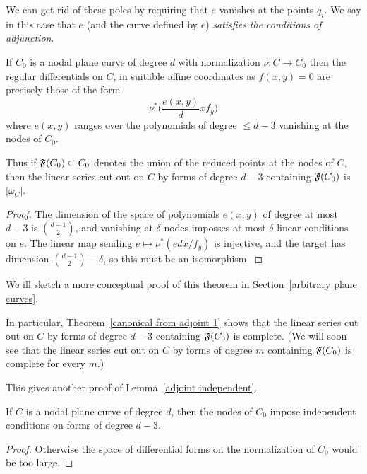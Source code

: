 We can get rid of these poles by requiring that $e$ vanishes at the points $q_i$. We say in this case that $e$ (and the curve defined by $e$) \emph{satisfies the conditions of adjunction}. 

\begin{theorem}\label{canonical from adjoint 1}
If $C_{0}$ is a nodal plane curve of degree $d$ with normalization $\nu: C\to C_{0}$
then the  regular differentials on  $C$, in suitable affine coordinates as $f(x,y) = 0$ 
 are precisely those of the form
 $$
\nu^{*}\biggl( \frac{e(x,y)}dx{f_{y}}\biggr)
$$
where 
$e(x,y)$ ranges over the polynomials of degree $\leq d-3$
vanishing at the nodes of $C_{0}.$

Thus if $\adj(C_{0})\subset C_{0}$ denotes the union
of the reduced points at the nodes of $C$, then  the linear series cut out on $C$ by 
forms of degree $d-3$ containing $\adj(C_{0})$ is $|\omega_{C}|$.
\end{theorem}

\begin{proof}
The dimension of the space of polynomials $e(x,y)$ of degree at most $d-3$ is $\binom{d-1}{2}$,
and vanishing at $\delta$ nodes imposses at most $\delta$ linear conditions on $e$. The linear map sending
$e\mapsto \nu^{*}(edx/f_{y})$ is injective, and the target has dimension 
$\binom{d-1}{2}-\delta$, so this must be an isomorphism.
\end{proof}
We ill sketch a more conceptual proof of this theorem in Section~\ref{arbitrary plane curves}.

In particular, Theorem~\ref{canonical from adjoint 1}
shows that the linear series cut out on $C$ by 
forms of degree $d-3$ containing $\adj(C_{0})$ is complete. (We will soon see that
 the linear series cut out on $C$ by 
forms of degree $m$ containing $\adj(C_{0})$ is complete for every $m$.)


This gives another proof of Lemma~\ref{adjoint independent}.

\begin{corollary}
If $C$ is a nodal plane curve of degree $d$, then the nodes of $C_{0}$ impose independent
conditions on forms of degree $d-3$.
\end{corollary}
\begin{proof}
 Otherwise the space of differential forms on the normalization of $C_{0}$ would be too large.
\end{proof}


